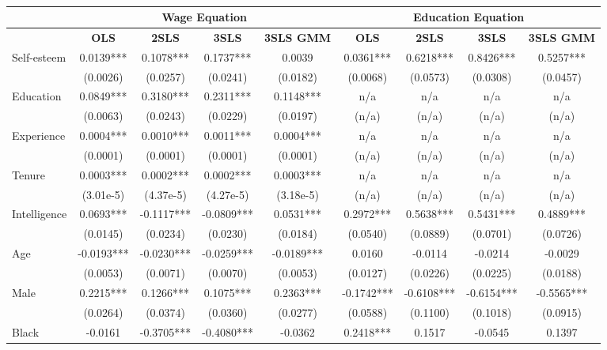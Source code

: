 \documentclass[12pt]{report}
\newcommand{\prbf}[1]{\textbf{#1}}
\begin{document}
\newpage
\begin{sidewaystable}
\small
\caption{\label{tab:wage06b}}
\vspace{2pt}
\centering\begin{tabular}{lc|c|c|c|c|c|c|c}
\hline
\hline
& \multicolumn{4}{|c|}{Wage Equation} & \multicolumn{4}{|c}{Education Equation}\\
\hline
& \prbf{OLS} & \prbf{2SLS} & \prbf{3SLS} & \prbf{3SLS GMM} & \prbf{OLS} & \prbf{2SLS} & \prbf{3SLS} & \prbf{3SLS GMM}\\
\hline
Self-esteem & 0.0139*** & 0.1078*** & 0.1737*** & 0.0039 & 0.0361*** & 0.6218*** & 0.8426*** & 0.5257***\\
& (0.0026) & (0.0257) & (0.0241) & (0.0182) & (0.0068) & (0.0573) & (0.0308) & (0.0457)\\
Education & 0.0849*** & 0.3180*** & 0.2311*** & 0.1148*** & n/a & n/a & n/a & n/a\\
& (0.0063) & (0.0243) & (0.0229) & (0.0197) & (n/a) & (n/a) & (n/a) & (n/a)\\
Experience & 0.0004*** & 0.0010*** & 0.0011*** & 0.0004*** & n/a & n/a & n/a & n/a\\
& (0.0001) & (0.0001) & (0.0001) & (0.0001) & (n/a) & (n/a) & (n/a) & (n/a)\\
Tenure & 0.0003*** & 0.0002*** & 0.0002*** & 0.0003*** & n/a & n/a & n/a & n/a\\
& (3.01e-5) & (4.37e-5) & (4.27e-5) & (3.18e-5) & (n/a) & (n/a) & (n/a) & (n/a)\\
Intelligence & 0.0693*** & -0.1117*** & -0.0809*** & 0.0531*** & 0.2972*** & 0.5638*** & 0.5431*** & 0.4889***\\
& (0.0145) & (0.0234) & (0.0230) & (0.0184) & (0.0540) & (0.0889) & (0.0701) & (0.0726)\\
Age & -0.0193*** & -0.0230*** & -0.0259*** & -0.0189*** & 0.0160 & -0.0114 & -0.0214 & -0.0029\\
& (0.0053) & (0.0071) & (0.0070) & (0.0053) & (0.0127) & (0.0226) & (0.0225) & (0.0188)\\
Male & 0.2215*** & 0.1266*** & 0.1075*** & 0.2363*** & -0.1742*** & -0.6108*** & -0.6154*** & -0.5565***\\
& (0.0264) & (0.0374) & (0.0360) & (0.0277) & (0.0588) & (0.1100) & (0.1018) & (0.0915)\\
Black & -0.0161 & -0.3705*** & -0.4080*** & -0.0362 & 0.2418*** & 0.1517 & -0.0545 & 0.1397\\

\end{tabular}
\end{sidewaystable}
\end{document}
